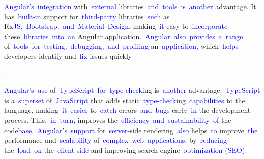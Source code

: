 \documentclass{article}
\begin{document}
\begin{tcolorbox}[colframe=black,colback=white]
{}\textcolor{blue}{Angular}\textcolor{blue}{'s}\textcolor{blue}{~integration} with\textcolor{blue}{~external} libraries\textcolor{blue}{~and}\textcolor{blue}{~tools}\textcolor{blue}{~is}\textcolor{blue}{~another} advantage\textcolor{blue}{.} It has\textcolor{blue}{~built}\textcolor{blue}{-in} support for\textcolor{blue}{~third}\textcolor{blue}{-party} libraries\textcolor{blue}{~such} as Rx\textcolor{blue}{JS}\textcolor{blue}{,}\textcolor{blue}{~Bootstrap}\textcolor{blue}{,}\textcolor{blue}{~and}\textcolor{blue}{~Material}\textcolor{blue}{~Design}, making\textcolor{blue}{~it} easy to\textcolor{blue}{~incorporate} these\textcolor{blue}{~libraries}\textcolor{blue}{~into}\textcolor{blue}{~an} Angular application\textcolor{blue}{.}\textcolor{blue}{~Angular}\textcolor{blue}{~also}\textcolor{blue}{~provides}\textcolor{blue}{~a}\textcolor{blue}{~range} of\textcolor{blue}{~tools}\textcolor{blue}{~for}\textcolor{blue}{~testing}\textcolor{blue}{,}\textcolor{blue}{~debugging}\textcolor{blue}{,}\textcolor{blue}{~and}\textcolor{blue}{~profiling} an\textcolor{blue}{~application}\textcolor{blue}{,} which\textcolor{blue}{~helps} developers identify and\textcolor{blue}{~fix} issues quickly\textcolor{blue}{.

}\textcolor{blue}{Angular}\textcolor{blue}{'s}\textcolor{blue}{~use} of\textcolor{blue}{~TypeScript}\textcolor{blue}{~for}\textcolor{blue}{~type}\textcolor{blue}{-check}ing is\textcolor{blue}{~another} advantage.\textcolor{blue}{~TypeScript} is a\textcolor{blue}{~sup}\textcolor{blue}{erset} of\textcolor{blue}{~JavaScript} that adds static\textcolor{blue}{~type}\textcolor{blue}{-check}ing\textcolor{blue}{~capabilities} to the language\textcolor{blue}{,} making\textcolor{blue}{~it}\textcolor{blue}{~easier} to\textcolor{blue}{~catch} errors\textcolor{blue}{~and}\textcolor{blue}{~bugs} early\textcolor{blue}{~in} the development process\textcolor{blue}{.} This\textcolor{blue}{,}\textcolor{blue}{~in}\textcolor{blue}{~turn}\textcolor{blue}{,} improves the\textcolor{blue}{~efficiency}\textcolor{blue}{~and}\textcolor{blue}{~sustainability}\textcolor{blue}{~of} the code\textcolor{blue}{base}.\textcolor{blue}{~Angular}'s\textcolor{blue}{~support} for\textcolor{blue}{~server}-side rendering\textcolor{blue}{~also} helps\textcolor{blue}{~to} improve\textcolor{blue}{~the} performance and\textcolor{blue}{~scalability} of\textcolor{blue}{~complex}\textcolor{blue}{~web}\textcolor{blue}{~applications}\textcolor{blue}{,} by\textcolor{blue}{~reducing} the\textcolor{blue}{~load}\textcolor{blue}{~on} the\textcolor{blue}{~client}\textcolor{blue}{-side} and improving search engine\textcolor{blue}{~optimization} (\textcolor{blue}{SEO}\textcolor{blue}{).} 


\end{tcolorbox}
\end{document}
